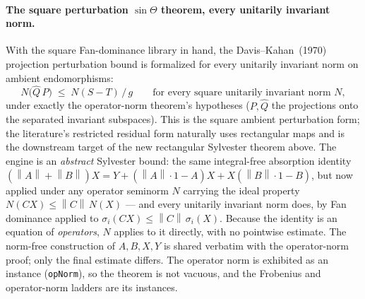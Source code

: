 \documentclass[11pt]{article}
\newcommand{\norm}[1]{\left\lVert #1\right\rVert}
\theoremstyle{remark}
\begin{document}
\paragraph{The square perturbation $\sin\Theta$ theorem, every unitarily invariant norm.}
With the square Fan-dominance library in hand, the Davis--Kahan~(1970)
projection perturbation bound is formalized for every unitarily invariant norm
on ambient endomorphisms:
\[
  N\bigl(\widehat Q\,P\bigr)\;\le\;N(S-T)\,/\,g
  \qquad\text{for every square unitarily invariant norm } N,
\]
under exactly the operator-norm theorem's hypotheses ($P,\widehat Q$ the
projections onto the separated invariant subspaces).  This is the square
ambient perturbation form; the literature's restricted residual form naturally
uses rectangular maps and is the downstream target of the new rectangular
Sylvester theorem above.  The engine is an
\emph{abstract} Sylvester bound: the same integral-free absorption identity
$(\norm{A}+\norm{B})X = Y + (\norm{A}\cdot1-A)X + X(\norm{B}\cdot1-B)$, but
now applied under any operator seminorm $N$ carrying the ideal property
$N(CX)\le\norm{C}\,N(X)$ --- and every unitarily invariant norm does, by Fan
dominance applied to $\sigma_i(CX)\le\norm{C}\,\sigma_i(X)$.  Because the
identity is an equation of \emph{operators}, $N$ applies to it directly, with
no pointwise estimate.  The norm-free construction of $A,B,X,Y$ is shared
verbatim with the operator-norm proof; only the final estimate differs.  The
operator norm is exhibited as an instance (\texttt{opNorm}), so the theorem is
not vacuous, and the Frobenius and operator-norm ladders are its instances.
\end{document}
